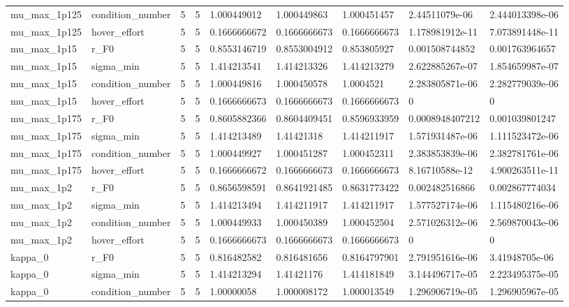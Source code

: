\begin{tabular}{@{}lllllllll@{}}
mu\_max\_1p125 & condition\_number & 5 & 5 & 1.000449012 & 1.000449863 & 1.000451457 & 2.44511079e-06 & 2.444013398e-06 \\
mu\_max\_1p125 & hover\_effort & 5 & 5 & 0.1666666672 & 0.1666666673 & 0.1666666673 & 1.178981912e-11 & 7.073891448e-11 \\
mu\_max\_1p15 & r\_F0 & 5 & 5 & 0.8553146719 & 0.8553004912 & 0.853805927 & 0.001508744852 & 0.001763964657 \\
mu\_max\_1p15 & sigma\_min & 5 & 5 & 1.414213541 & 1.414213326 & 1.414213279 & 2.622885267e-07 & 1.854659987e-07 \\
mu\_max\_1p15 & condition\_number & 5 & 5 & 1.000449816 & 1.000450578 & 1.0004521 & 2.283805871e-06 & 2.282779039e-06 \\
mu\_max\_1p15 & hover\_effort & 5 & 5 & 0.1666666673 & 0.1666666673 & 0.1666666673 & 0 & 0 \\
mu\_max\_1p175 & r\_F0 & 5 & 5 & 0.8605882366 & 0.8604409451 & 0.8596933959 & 0.0008948407212 & 0.001039801247 \\
mu\_max\_1p175 & sigma\_min & 5 & 5 & 1.414213489 & 1.41421318 & 1.414211917 & 1.571931487e-06 & 1.111523472e-06 \\
mu\_max\_1p175 & condition\_number & 5 & 5 & 1.000449927 & 1.000451287 & 1.000452311 & 2.383853839e-06 & 2.382781761e-06 \\
mu\_max\_1p175 & hover\_effort & 5 & 5 & 0.1666666672 & 0.1666666673 & 0.1666666673 & 8.16710588e-12 & 4.900263511e-11 \\
mu\_max\_1p2 & r\_F0 & 5 & 5 & 0.8656598591 & 0.8641921485 & 0.8631773422 & 0.002482516866 & 0.002867774034 \\
mu\_max\_1p2 & sigma\_min & 5 & 5 & 1.414213494 & 1.414211917 & 1.414211917 & 1.577527174e-06 & 1.115480216e-06 \\
mu\_max\_1p2 & condition\_number & 5 & 5 & 1.000449933 & 1.000450389 & 1.000452504 & 2.571026312e-06 & 2.569870043e-06 \\
mu\_max\_1p2 & hover\_effort & 5 & 5 & 0.1666666673 & 0.1666666673 & 0.1666666673 & 0 & 0 \\
kappa\_0 & r\_F0 & 5 & 5 & 0.816482582 & 0.816481656 & 0.8164797901 & 2.791951616e-06 & 3.41948705e-06 \\
kappa\_0 & sigma\_min & 5 & 5 & 1.414213294 & 1.41421176 & 1.414181849 & 3.144496717e-05 & 2.223495375e-05 \\
kappa\_0 & condition\_number & 5 & 5 & 1.00000058 & 1.000008172 & 1.000013549 & 1.296906719e-05 & 1.296905967e-05 \\

\end{tabular}

